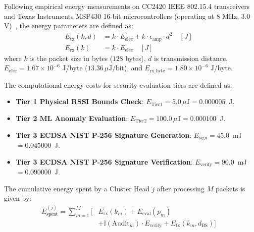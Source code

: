 \documentclass[journal]{IEEEtran}
\begin{document}
Following empirical energy measurements on CC2420 IEEE 802.15.4 transceivers and Texas Instruments MSP430 16-bit microcontrollers (operating at 8 MHz, 3.0 V)~\cite{ref_mcu_energy_12, ref_msp430_bench_14}, the energy parameters are defined as:
\begin{align}
E_{\text{tx}}(k, d) &= k \cdot E_{\text{elec}} + k \cdot \epsilon_{\text{amp}} \cdot d^2 \quad [J] \\
E_{\text{rx}}(k) &= k \cdot E_{\text{elec}} \quad [J]
\end{align}
where $k$ is the packet size in bytes ($128$ bytes), $d$ is transmission distance, $E_{\text{elec}} = 1.67 \times 10^{-6}$ J/byte ($13.36\,\mu\text{J/bit}$), and $E_{\text{rx\_byte}} = 1.80 \times 10^{-6}$ J/byte.

The computational energy costs for security evaluation tiers are defined as:
\begin{itemize}
    \item \textbf{Tier 1 Physical RSSI Bounds Check}: $E_{\text{Tier1}} = 5.0\,\mu\text{J} = 0.000005$~J.
    \item \textbf{Tier 2 ML Anomaly Evaluation}: $E_{\text{Tier2}} = 100.0\,\mu\text{J} = 0.000100$~J.
    \item \textbf{Tier 3 ECDSA NIST P-256 Signature Generation}: $E_{\text{sign}} = 45.0$~mJ $= 0.045000$~J.
    \item \textbf{Tier 3 ECDSA NIST P-256 Signature Verification}: $E_{\text{verify}} = 90.0$~mJ $= 0.090000$~J.
\end{itemize}

The cumulative energy spent by a Cluster Head $j$ after processing $M$ packets is given by:
\begin{equation}
\begin{aligned}
E_{\text{spent}}^{(j)} = \sum_{m=1}^{M} \Big[ &E_{\text{rx}}(k_m) + E_{\text{eval}}(p_m) \\
&+ \mathbb{I}(\text{Audit}_m) \cdot E_{\text{verify}} + E_{\text{tx}}(k_m, d_{\text{BS}}) \Big]
\end{aligned}
\end{equation}
\end{document}
